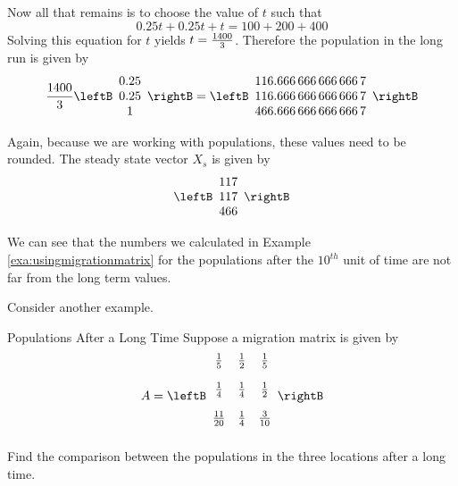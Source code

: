 \begin{solution}
Now all that remains is to choose the value of $t$ such that
\begin{equation*}
0.25t+0.25t+t=100+200+400
\end{equation*}
Solving this equation for $t$ yields $t=\vspace{.05in} \frac{1400}{3}$. Therefore the population in the long run
is given by
\begin{equation*}
\vspace{.05in} \frac{1400}{3}\leftB
\begin{array}{c}
0.25 \\
0.25 \\
1
\end{array}
\rightB = \leftB
\begin{array}{c}
116. 666\,666\,666\, 666\,7 \\
116. 666\,666\,666\, 666\,7 \\
466. 666\,666\,666\, 666\,7
\end{array}
\rightB 
\end{equation*}

Again, because we are working with populations, these values need to be rounded. The steady state vector $X_s$ is given by
\[
\leftB
\begin{array}{c}
117 \\
117 \\
466
\end{array}
\rightB 
\]
\end{solution}

We can see that the numbers we calculated in Example \ref{exa:usingmigrationmatrix} for the populations
after the $10^{th}$ unit of time are not far from the long term values. 

Consider another example.

\begin{example}{Populations After a Long Time}\label{exa:populationafterlongtime}
Suppose a migration matrix is given by 
\begin{equation*}
A = \leftB
\begin{array}{ccc}
\vspace{.05in} \frac{1}{5} & \vspace{.05in} \frac{1}{2} & \vspace{.05in}
\frac{1}{5} \\
\vspace{.05in} \frac{1}{4} & \vspace{.05in} \frac{1}{4} & \vspace{.05in}
\frac{1}{2} \\
\vspace{.05in} \frac{11}{20} & \vspace{.05in} \frac{1}{4} & \vspace{.05in}
\frac{3}{10}
\end{array}
\rightB 
\end{equation*}
 Find the comparison between the populations in the three
locations after a long time.
\end{example}

